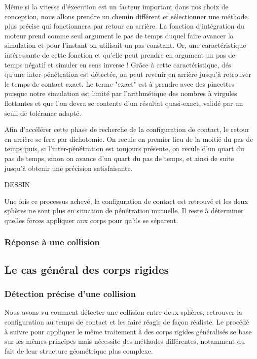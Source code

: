 Même si la vitesse d'éxecution est un facteur important dans nos choix de conception, nous allons prendre un chemin différent et sélectionner une méthode plus précise qui fonctionnera par retour en arrière. La fonction d'intégration du moteur prend comme seul argument le pas de temps duquel faire avancer la simulation et pour l'instant on utilisait un pas constant. Or, une caractéristique intéressante de cette fonction et qu'elle peut prendre en argument un pas de temps négatif et simuler en sens inverse ! Grâce à cette caractéristique, dés qu'une inter-pénétration est détectée, on peut revenir en arrière jusqu'à retrouver le temps de contact exact. Le terme "exact" est à prendre avec des pincettes puisque notre simulation est limité par l'arithmétique des nombres à virgules flottantes et que l'on devra se contente d'un résultat quasi-exact, validé par un seuil de tolérance adapté.

Afin d'accélérer cette phase de recherche de la configuration de contact, le retour en arrière se fera par dichotomie. On recule en premier lieu de la moitié du pas de temps puis, si l'inter-pénétration est toujours présente, on recule d'un quart du pas de temps, sinon on avance d'un quart du pas de temps, et ainsi de suite jusqu'à obtenir une précision satisfaisante.

DESSIN

Une fois ce processus achevé, la configuration de contact est retrouvé et les deux sphères ne sont plus en situation de pénétration mutuelle. Il reste à déterminer quelles forces appliquer aux corps pour qu'ils se séparent.

\subsubsection{Réponse à une collision}



\subsection{Le cas général des corps rigides}

\subsubsection{Détection précise d'une collision}

Nous avons vu comment détecter une collision entre deux sphères, retrouver la configuration au temps de contact et les faire réagir de façon réaliste. Le procédé à suivre pour appliquer le même traitement à des corps rigides généralisés se base sur les mêmes principes mais nécessite des méthodes différentes, notamment du fait de leur structure géométrique plus complexe.

